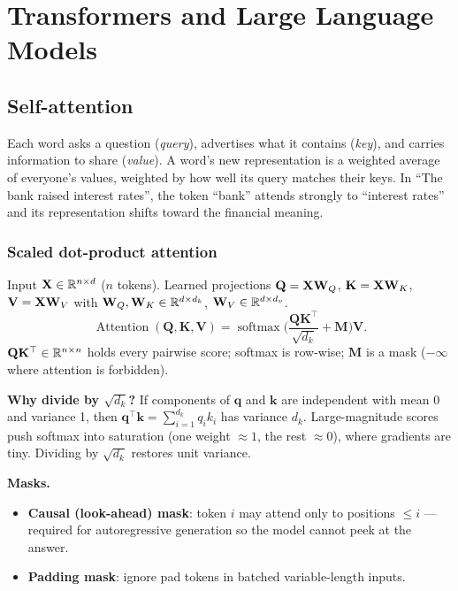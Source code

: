 \chapter{Transformers and Large Language Models}
\label{ch:transformers}

\section{Self-attention}
\begin{intuition}
Each word asks a question (\emph{query}), advertises what it contains (\emph{key}), and carries information to share (\emph{value}). A word's new representation is a weighted average of everyone's values, weighted by how well its query matches their keys. In ``The bank raised interest rates'', the token ``bank'' attends strongly to ``interest rates'' and its representation shifts toward the financial meaning.
\end{intuition}

\subsection{Scaled dot-product attention}
Input $\mathbf{X}\in\mathbb{R}^{n\times d}$ ($n$ tokens). Learned projections $\mathbf{Q}=\mathbf{X}\mathbf{W}_Q$, $\mathbf{K}=\mathbf{X}\mathbf{W}_K$, $\mathbf{V}=\mathbf{X}\mathbf{W}_V$ with $\mathbf{W}_Q,\mathbf{W}_K\in\mathbb{R}^{d\times d_k}$, $\mathbf{W}_V\in\mathbb{R}^{d\times d_v}$.
\[\operatorname{Attention}(\mathbf{Q},\mathbf{K},\mathbf{V})=\operatorname{softmax}\Big(\frac{\mathbf{Q}\mathbf{K}^\top}{\sqrt{d_k}}+\mathbf{M}\Big)\mathbf{V}.\]
$\mathbf{Q}\mathbf{K}^\top\in\mathbb{R}^{n\times n}$ holds every pairwise score; softmax is row-wise; $\mathbf{M}$ is a mask ($-\infty$ where attention is forbidden).

\textbf{Why divide by $\sqrt{d_k}$?} If components of $\mathbf{q}$ and $\mathbf{k}$ are independent with mean 0 and variance 1, then $\mathbf{q}^\top\mathbf{k}=\sum_{i=1}^{d_k}q_ik_i$ has variance $d_k$. Large-magnitude scores push softmax into saturation (one weight $\approx1$, the rest $\approx0$), where gradients are tiny. Dividing by $\sqrt{d_k}$ restores unit variance.

\textbf{Masks.}
\begin{itemize}
  \item \textbf{Causal (look-ahead) mask}: token $i$ may attend only to positions $\le i$ --- required for autoregressive generation so the model cannot peek at the answer.
  \item \textbf{Padding mask}: ignore pad tokens in batched variable-length inputs.
\end{itemize}

